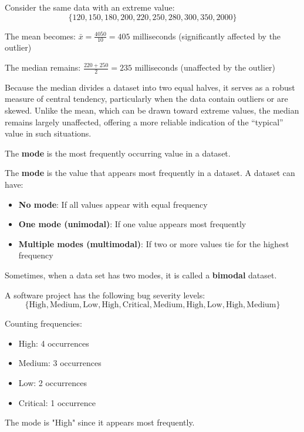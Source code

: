 \begin{example}

Consider the same data with an extreme value:
\[
\{120, 150, 180, 200, 220, 250, 280, 300, 350, 2000\}
\]

The mean becomes: $\bar{x} = \frac{4050}{10} = 405$ milliseconds (significantly affected by the outlier)

The median remains: $\frac{220 + 250}{2} = 235$ milliseconds (unaffected by the outlier)
\end{example}

Because the median divides a dataset into two equal halves, it serves as a robust measure of central tendency, particularly when the data contain outliers or are skewed. Unlike the mean, which can be drawn toward extreme values, the median remains largely unaffected, offering a more reliable indication of the ``typical'' value in such situations.

The \textbf{mode} is the most frequently occurring value in a dataset.

\begin{definition}[Mode]
The \textbf{mode} is the value that appears most frequently in a dataset. A dataset can have:
\begin{itemize}
    \item \textbf{No mode}: If all values appear with equal frequency
    \item \textbf{One mode (unimodal)}: If one value appears most frequently
    \item \textbf{Multiple modes (multimodal)}: If two or more values tie for the highest frequency
\end{itemize}
\end{definition}

Sometimes, when a data set has two modes, it is called a \textbf{bimodal} dataset.

\newpage

\begin{example}

A software project has the following bug severity levels:
\[
\{\text{High}, \text{Medium}, \text{Low}, \text{High}, \text{Critical}, \text{Medium}, \text{High}, \text{Low}, \text{High}, \text{Medium}\}
\]

Counting frequencies:
\begin{itemize}
    \item High: 4 occurrences
    \item Medium: 3 occurrences  
    \item Low: 2 occurrences
    \item Critical: 1 occurrence
\end{itemize}

The mode is "High" since it appears most frequently.
\end{example}

